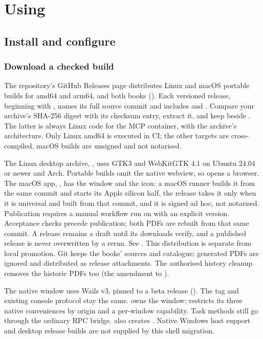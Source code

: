 \part{Using \nodwyn}

\chapter{Install and configure}

\section{Download a checked build}

The repository's GitHub Releases page distributes Linux and macOS portable
builds for amd64 and arm64, and both books (). Each
versioned release, beginning with , names its full source commit and includes
 and . Compare your archive's SHA-256
digest with its checksum entry, extract it, and keep  beside
. The latter is always Linux code for the MCP container,
with the archive's architecture. Only Linux amd64 is executed in CI; the
other targets are cross-compiled. macOS builds are unsigned and not notarised.

The Linux desktop archive, ,
uses GTK3 and WebKitGTK 4.1 on Ubuntu 24.04 or newer and Arch.
Portable builds omit the native webview, so  opens a
browser. The macOS app, , has the window
and the icon: a macOS runner builds it from the same commit and starts its
Apple silicon half, the release takes it only when it is universal and
built from that commit, and it is signed ad hoc, not notarised. Publication requires a manual workflow run on  with an
explicit version. Acceptance checks precede publication; both PDFs are
rebuilt from that same commit. A release remains a draft until its downloads
verify, and a published release is never overwritten by a rerun. See
. This distribution is separate from local promotion.
Git keeps the books' sources and catalogue; generated PDFs are ignored and
distributed as release attachments. The authorised history cleanup removes
the historic PDFs too (the amendment to ).

The native window uses Wails v3, pinned to a beta release
(). The  tag and existing console protocol stay the
same.  owns the window;
 restricts its three native conveniences
by origin and a per-window capability. Task methods still go through the
ordinary RPC bridge.  also creates
. Native Windows host support and
desktop release builds are not supplied by this shell migration.

